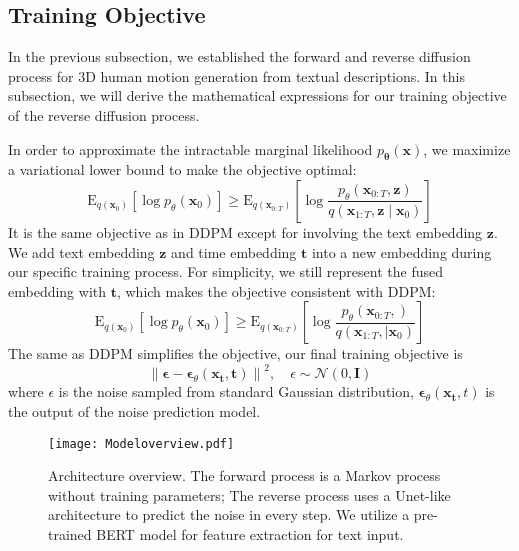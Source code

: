 \documentclass{article}
\begin{document}
\subsection{Training Objective}
In the previous subsection, we established the forward and reverse diffusion process for 3D human motion generation from textual descriptions. In this subsection, we will derive the mathematical expressions for our training objective of the reverse diffusion process. 

In order to approximate the intractable marginal likelihood $p_{\boldsymbol{\theta}}\left(\mathbf{x} \right)$, we maximize a variational lower bound to make the objective optimal:
\begin{equation}
\mathrm{E}_{q\left(\mathbf{x}_{0}\right)}\left[\log p_{\theta}\left(\mathbf{x}_{0}\right)\right] \geq \mathrm{E}_{q\left(\mathbf{x}_{0: T}\right)}\left[\log \frac{p_{\theta}\left(\mathbf{x}_{0: T}, \mathbf{z}\right)}{q\left(\mathbf{x}_{1: T},  \mathbf{z}\mid \mathbf{x}_{0}\right)}\right]
\end{equation}
It is the same objective as in DDPM \cite{ho2020denoising} except for involving the text embedding $\mathbf{z}$. We add text embedding $\mathbf{z}$ and time embedding $\mathbf{t}$ into a new embedding during our specific training process. For simplicity, we still represent the fused embedding with $\mathbf{t}$, which makes the objective consistent with DDPM:
\begin{equation}
\mathrm{E}_{q\left(\mathbf{x}_{0}\right)}\left[\log p_{\theta}\left(\mathbf{x}_{0}\right)\right] \geq \mathrm{E}_{q\left(\mathbf{x}_{0: T}\right)}\left[\log \frac{p_{\theta}\left(\mathbf{x}_{0: T}, \right)}{q\left(\mathbf{x}_{1: T}, \mid \mathbf{x}_{0}\right)}\right]
\end{equation}
The same as DDPM simplifies the objective, our final training objective is
\begin{equation}
\left\|\boldsymbol{\epsilon}-\boldsymbol{\epsilon}_{\theta}\left(\mathbf{x}_\mathbf{t}, \mathbf{t}\right)\right\|^{2}, \quad \epsilon \sim \mathcal{N}(0, \mathbf{I})
\end{equation}
where $\epsilon$ is the noise sampled from standard Gaussian distribution, $\boldsymbol{\epsilon}_{\theta}\left(\mathbf{x}_\mathbf{t}, t\right)$ is the output of the noise prediction model.

\begin{figure}[h]
    \centering
    \texttt{[image: Modeloverview.pdf]}
    \caption{Architecture overview. The forward process is a Markov process without training parameters; The reverse process uses a Unet-like architecture to predict the noise in every step. We utilize a pre-trained BERT model for feature extraction for text input.}
    \label{fig:1}
    \vspace{-5mm}
\end{figure}
\end{document}
